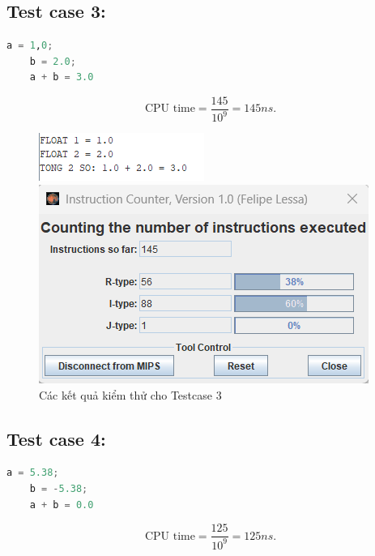 \subsection{Test case 3:}
\begin{lstlisting}[language=Python]
    a = 1,0;
    b = 2.0;
    a + b = 3.0
\end{lstlisting}
\[
\text{CPU time} = \frac{\text{145}}{10^9} = 145 ns.
\]
\begin{figure}[!h]
    \centering
    \begin{minipage}[b]{0.48\textwidth}
        \centering
        \includegraphics[width=\textwidth]{image/TESTCASE/Testcase 3.png}
    \end{minipage}
    \hfill
    \begin{minipage}[b]{0.48\textwidth}
        \centering
        \includegraphics[width=\textwidth]{image/TESTCASE/Instruction Counter 3.png}
    \end{minipage}
    \vspace{0.5cm}
    \caption{Các kết quả kiểm thử cho Testcase 3}
\end{figure}

\vspace{0.5 cm}

\subsection{Test case 4:}
\begin{lstlisting}[language=Python]
    a = 5.38;
    b = -5.38;
    a + b = 0.0
\end{lstlisting}
\[
\text{CPU time} = \frac{\text{125}}{10^9} = 125 ns.
\]

